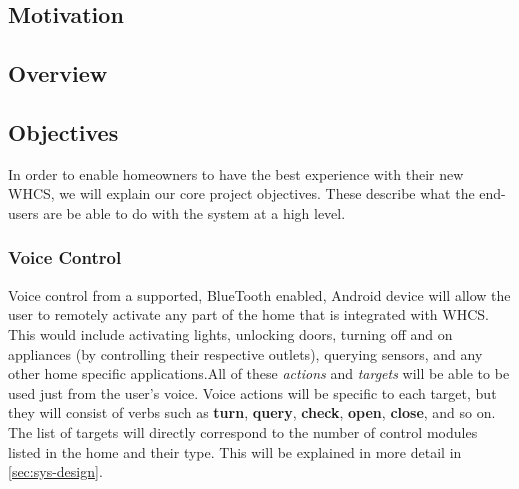 
\subsection{Motivation}

\subsection{Overview}


\subsection{Objectives}
In order to enable homeowners to have the best experience with their new WHCS,
we will explain our core project objectives. These describe what the end-users
are be able to do with the system at a high level.

\subsubsection{Voice Control}
Voice control from a supported, BlueTooth enabled, Android device will allow
the user to remotely activate any part of the home that is integrated with
WHCS. This would include activating lights, unlocking doors, turning off and on
appliances (by controlling their respective outlets), querying sensors, and any
other home specific applications.\footnotemark All of these \emph{actions} and
\emph{targets} will be able to be used just from the user's voice. Voice
actions will be specific to each target, but they will consist of verbs such as
\textbf{turn}, \textbf{query}, \textbf{check}, \textbf{open}, \textbf{close},
and so on. The list of targets will directly correspond to the number of
control modules listed in the home and their type.  This will be explained in
more detail in \autoref{sec:sys-design}.



